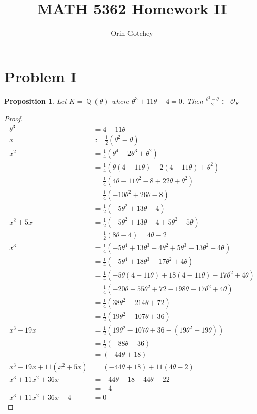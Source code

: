 \documentclass{article}
\newtheorem{proposition}[theorem]{Proposition}
\DeclareMathOperator{\Q}{\mathbb{Q}}
\DeclareMathOperator{\scrO}{\mathscr{O}}
\begin{document}
\title{MATH 5362 Homework II}
\author{Orin Gotchey}
\maketitle
\section{Problem I}
\begin{proposition}
	Let $K=\Q(\theta)$ where $\theta^3+11\theta-4=0$.  Then $\frac{\theta^2-\theta}{2}\in\scrO_K$
\end{proposition}
\begin{proof}
	\begin{align*}
	\theta^3 &= 4-11\theta\\
	x &:= \frac{1}{2}(\theta^2-\theta)\\
	x^2 &= \frac{1}{4}(\theta^4-2\theta^3+\theta^2)\\
	&=\frac{1}{4}(\theta(4-11\theta)-2(4-11\theta)+\theta^2)\\
	&=\frac{1}{4}(4\theta-11\theta^2-8+22\theta+\theta^2)\\
	&=\frac{1}{4}(-10\theta^2+26\theta-8)\\
	&=\frac{1}{2}(-5\theta^2+13\theta-4)\\
	x^2+5x&=\frac{1}{2}(-5\theta^2+13\theta-4+5\theta^2-5\theta)\\
	&= \frac{1}{2}(8\theta-4) = 4\theta-2\\
	x^3 &= \frac{1}{4}(-5\theta^4+13\theta^3-4\theta^2+5\theta^3-13\theta^2+4\theta)\\
	&= \frac{1}{4}(-5\theta^4+18\theta^3-17\theta^2+4\theta)\\
	&=\frac{1}{4}(-5\theta(4-11\theta)+18(4-11\theta)-17\theta^2+4\theta)\\
	&=\frac{1}{4}(-20\theta+55\theta^2+72-198\theta-17\theta^2+4\theta)\\
	&=\frac{1}{4}(38\theta^2-214\theta+72)\\
	&=\frac{1}{2}(19\theta^2-107\theta+36)\\
	x^3-19x&=\frac{1}{2}(19\theta^2-107\theta+36-(19\theta^2-19\theta))\\
	&= \frac{1}{2}(-88\theta+36)\\
	&= (-44\theta+18)\\
	x^3-19x+11(x^2+5x) &= (-44\theta+18)+11(4\theta-2)\\
	x^3+11x^2+36x&= -44\theta+18+44\theta-22\\
	&= -4\\
	x^3+11x^2+36x+4&=0
	\end{align*}
\end{proof}
\end{document}

